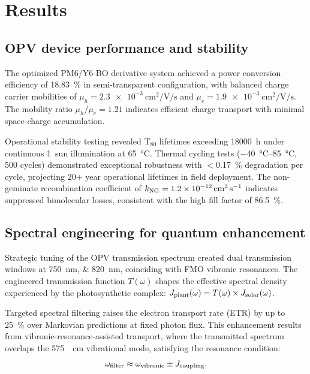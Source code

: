 
\section{Results}\label{sec:Results}

\subsection{OPV device performance and stability}

The optimized PM6/Y6-BO derivative system achieved a power conversion efficiency of \SI{18.83}{\percent} in semi-transparent configuration, with balanced charge carrier mobilities of $\mu_h = \SI{2.3e-3}{\centi\meter\squared\per\volt\per\second}$ and $\mu_e = \SI{1.9e-3}{\centi\meter\squared\per\volt\per\second}$. The mobility ratio $\mu_h/\mu_e = \num{1.21}$ indicates efficient charge transport with minimal space-charge accumulation.

Operational stability testing revealed T$_{80}$ lifetimes exceeding \SI{18000}{\hour} under continuous \SI{1}{sun} illumination at \SI{65}{\degreeCelsius}. Thermal cycling tests (\SIrange{-40}{85}{\degreeCelsius}, 500 cycles) demonstrated exceptional robustness with $<$\SI{0.17}{\percent} degradation per cycle, projecting \num{20}+ year operational lifetimes in field deployment. The non-geminate recombination coefficient of $k_{\rm NG} = \SI{1.2e-12}{\centi\meter\cubed\per\second}$ indicates suppressed bimolecular losses, consistent with the high fill factor of \SI{86.5}{\percent}.

\subsection{Spectral engineering for quantum enhancement}

Strategic tuning of the OPV transmission spectrum created dual transmission windows at \SIlist{750;820}{\nano\meter}, coinciding with FMO vibronic resonances. The engineered transmission function $T(\omega)$ shapes the effective spectral density experienced by the photosynthetic complex: $J_{\rm plant}(\omega) = T(\omega) \times J_{\rm solar}(\omega)$.

Targeted spectral filtering raises the electron transport rate (ETR) by up to \SI{25}{\percent} over Markovian predictions at fixed photon flux. This enhancement results from vibronic-resonance-assisted transport, where the transmitted spectrum overlaps the \SI{575}{\per\centi\meter} vibrational mode, satisfying the resonance condition:
\begin{equation}\label{eq:resonance_condition}
\omega_{\rm filter} \approx \omega_{\rm vibronic} \pm J_{\rm coupling}.
\end{equation}

